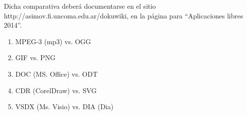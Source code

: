 \documentclass[12pt]{article}
\begin{document}
Dicha comparativa deberá documentarse en el sitio 
http://asimov.fi.uncoma.edu.ar/dokuwiki, en la página 
para ``Aplicaciones libres 2014''. 

\begin{enumerate}
\item MPEG-3 (mp3) vs. OGG
\item GIF vs. PNG 
\item DOC (MS. Office) vs. ODT
\item CDR (CorelDraw) vs. SVG 
\item VSDX (Ms. Visio) vs. DIA (Dia)
\end{enumerate}
 
\end{document}

